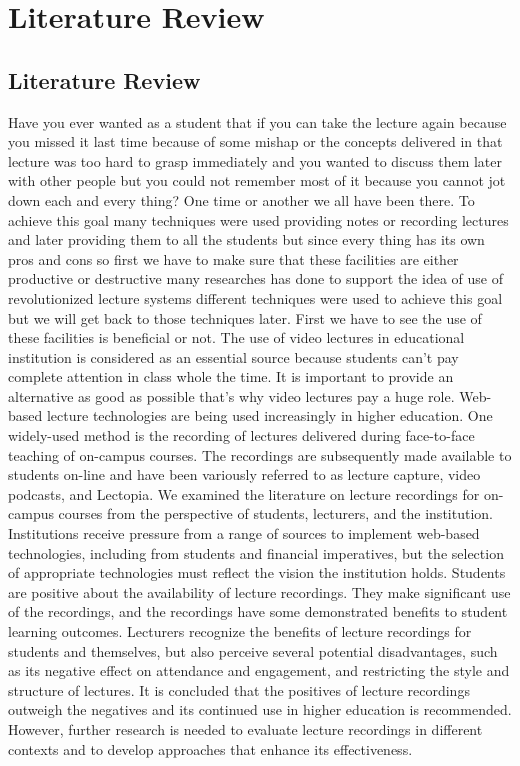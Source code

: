 
\chapter{Literature Review} %
\label{Chapter2}

\section{Literature Review}
Have you ever wanted as a student that if you can take the lecture again because you missed it last time because of some mishap or the concepts delivered in that lecture was too hard to grasp immediately and you wanted to discuss them later with other people but you could not remember most of it because you cannot jot down each and every thing? One time or another we all have been there. To achieve this goal many techniques were used providing notes or recording lectures and later providing them to all the students but since every thing has its own pros and cons so first we have to make sure that these facilities are either productive or destructive many researches has done to support the idea of use of revolutionized lecture systems different techniques were used to achieve this goal but we will get back to those techniques later. First we have to see the use of these facilities is beneficial or not.
The use of video lectures in educational institution is considered as an essential source because students can't pay complete attention in class whole the time. It is important to provide an alternative as good as possible that's why video lectures pay a huge role. Web-based lecture technologies are being used increasingly in higher education. One widely-used method is the recording of lectures delivered during face-to-face teaching of on-campus courses. The recordings are subsequently made available to students on-line and have been variously referred to as lecture capture, video podcasts, and Lectopia. We examined the literature on lecture recordings for on-campus courses from the perspective of students, lecturers, and the institution. Institutions receive pressure from a range of sources to implement web-based technologies, including from students and financial imperatives, but the selection of appropriate technologies must reflect the vision the institution holds. Students are positive about the availability of lecture recordings. They make significant use of the recordings, and the recordings have some demonstrated benefits to student learning outcomes. Lecturers recognize the benefits of lecture recordings for students and themselves, but also perceive several potential disadvantages, such as its negative effect on attendance and engagement, and restricting the style and structure of lectures. It is concluded that the positives of lecture recordings outweigh the negatives and its continued use in higher education is recommended. However, further research is needed to evaluate lecture recordings in different contexts and to develop approaches that enhance its effectiveness.\cite{OCallaghan2017}\\
